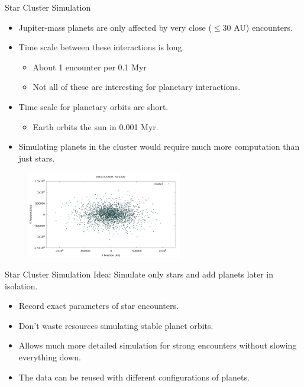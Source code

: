 \documentclass{beamer}
\begin{document}
\begin{frame}{Star Cluster Simulation}
    \begin{itemize}
        \item Jupiter-mass planets are only affected by very close ($\le $30 AU) encounters.
        \item Time scale between these interactions is long.
            \begin{itemize}
                \item About 1 encounter per 0.1 Myr
                \item Not all of these are interesting for planetary interactions.
            \end{itemize}
        \item Time scale for planetary orbits are short.
            \begin{itemize}
                \item Earth orbits the sun in 0.001 Myr.
            \end{itemize}
        \item Simulating planets in the cluster would require much more
            computation than just stars.
    \end{itemize}
    \begin{figure}
        \includegraphics[height=1.5in]{cluster1.png}
    \end{figure}
\end{frame}

\begin{frame}{Star Cluster Simulation}
    Idea: Simulate only stars and add planets later in isolation.
    \begin{itemize}
        \item Record exact parameters of star encounters.
        \item Don't waste resources simulating stable planet orbits.
        \item Allows much more detailed simulation for strong encounters
            without slowing everything down.
        \item The data can be reused with different configurations of planets.
    \end{itemize}
\end{frame}
\end{document}
